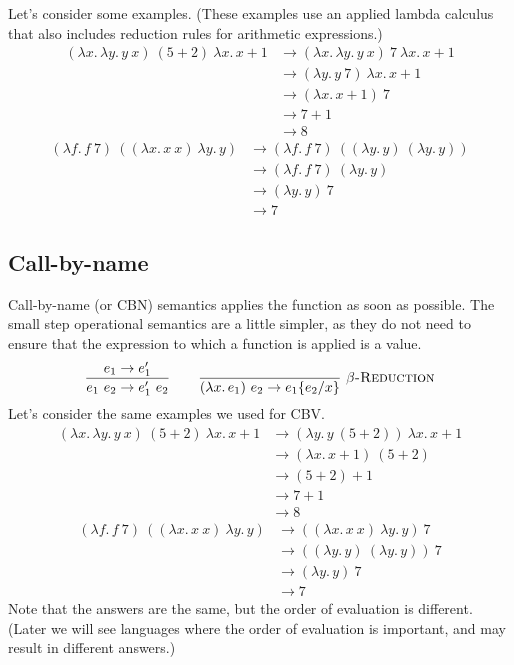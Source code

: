 Let's consider some examples. (These examples use an applied lambda calculus that also includes
reduction rules for arithmetic expressions.)
\begin{align*}
  (\lambda x.\,\lambda y.\,y\ x)\ (5+2)\ \lambda x.\,x+1
    &\to(\lambda x.\,\lambda y.\,y\ x)\ 7\ \lambda x.\,x+1\\
    &\to(\lambda y.\,y\ 7)\ \lambda x.\,x+1\\
    &\to(\lambda x.\,x+1)\ 7\\
    &\to 7+1\\
    &\to 8
\end{align*}
\begin{align*}
  (\lambda f.\,f\ 7)\ ((\lambda x.\,x\ x)\ \lambda y.\,y)
    &\to(\lambda f.\,f\ 7)\ ((\lambda y.\,y)\ (\lambda y.\,y))\\
    &\to(\lambda f.\,f\ 7)\ (\lambda y.\,y)\\
    &\to(\lambda y.\,y)\ 7\\
    &\to 7
\end{align*}

\subsection{Call-by-name}

Call-by-name (or CBN) semantics applies the function as soon as possible. The small step
operational semantics are a little simpler, as they do not need to ensure that the expression to
which a function is applied is a value.
\[
  \rul{e_1\to e_1'}{e_1\ e_2\to e_1'\ e_2}
  \qquad
  \infr{}{(\lambda x.\,e_1)\ e_2\to\sub{e_1}{e_2}{x}}{$\beta$-Reduction}
\]
Let's consider the same examples we used for CBV.
\begin{align*}
  (\lambda x.\,\lambda y.\,y\ x)\ (5+2)\ \lambda x.\,x+1
    &\to(\lambda y.\,y\ (5+2))\ \lambda x.\,x+1\\
    &\to(\lambda x.\,x+1)\ (5+2)\\
    &\to(5+2)+1\\
    &\to 7+1\\
    &\to 8
\end{align*}
\begin{align*}
  (\lambda f.\,f\ 7)\ ((\lambda x.\,x\ x)\ \lambda y.\,y)
    &\to((\lambda x.\,x\ x)\ \lambda y.\,y)\ 7\\
    &\to((\lambda y.\,y)\ (\lambda y.\,y))\ 7\\
    &\to(\lambda y.\,y)\ 7\\
    &\to 7
\end{align*}
Note that the answers are the same, but the order of evaluation is different. (Later we will see
languages where the order of evaluation is important, and may result in different answers.)

